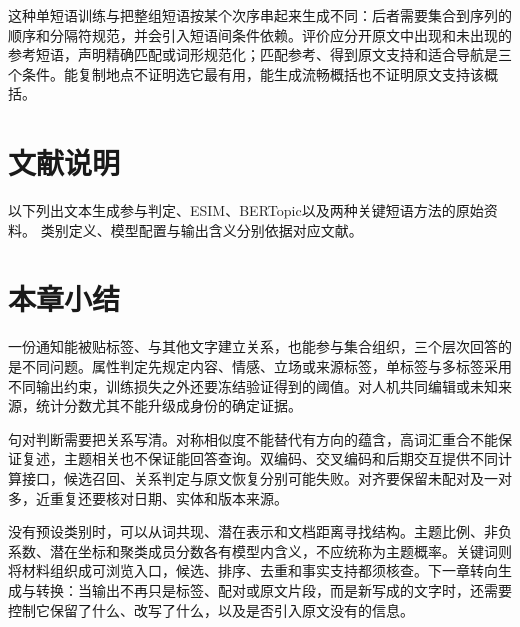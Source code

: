 这种单短语训练与把整组短语按某个次序串起来生成不同：后者需要集合到序列的顺序和分隔符规范，并会引入短语间条件依赖。评价应分开原文中出现和未出现的参考短语，声明精确匹配或词形规范化；匹配参考、得到原文支持和适合导航是三个条件。能复制地点不证明选它最有用，能生成流畅概括也不证明原文支持该概括。

\section*{文献说明}

以下列出文本生成参与判定、ESIM、BERTopic以及两种关键短语方法的原始资料。
类别定义、模型配置与输出含义分别依据对应文献。
\begin{fullwidth}
  \small
  \noindent{}\par\medskip
  \noindent{}\par\medskip
  \noindent{}\par\medskip
  \noindent{}\par\medskip
  \noindent{}
\end{fullwidth}

\section{本章小结}
\label{sec:nlp-classification-summary}

一份通知能被贴标签、与其他文字建立关系，也能参与集合组织，三个层次回答的是不同问题。属性判定先规定内容、情感、立场或来源标签，单标签与多标签采用不同输出约束，训练损失之外还要冻结验证得到的阈值。对人机共同编辑或未知来源，统计分数尤其不能升级成身份的确定证据。

句对判断需要把关系写清。对称相似度不能替代有方向的蕴含，高词汇重合不能保证复述，主题相关也不保证能回答查询。双编码、交叉编码和后期交互提供不同计算接口，候选召回、关系判定与原文恢复分别可能失败。对齐要保留未配对及一对多，近重复还要核对日期、实体和版本来源。

没有预设类别时，可以从词共现、潜在表示和文档距离寻找结构。主题比例、非负系数、潜在坐标和聚类成员分数各有模型内含义，不应统称为主题概率。关键词则将材料组织成可浏览入口，候选、排序、去重和事实支持都须核查。下一章转向生成与转换：当输出不再只是标签、配对或原文片段，而是新写成的文字时，还需要控制它保留了什么、改写了什么，以及是否引入原文没有的信息。
